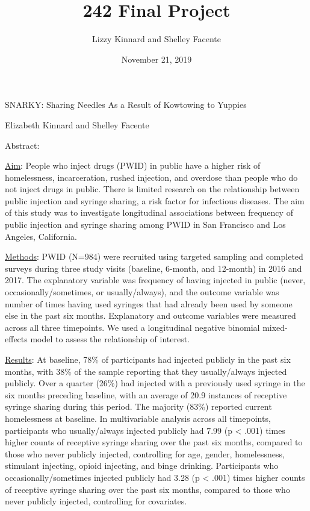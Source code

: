 \documentclass[ignorenonframetext,]{beamer}
\title{242 Final Project}
\author{Lizzy Kinnard and Shelley Facente}
\date{November 21, 2019}
\begin{document}
\frame{\titlepage}

\begin{frame}{}

\begin{block}{SNARKY: Sharing Needles As a Result of Kowtowing to
Yuppies}

\vspace{8pt}

Elizabeth Kinnard and Shelley Facente

\vspace{10pt}

\end{block}

\begin{block}{Abstract:}

\vspace{5pt}

\fontsize{7}{7}\selectfont
\underline{Aim}: People who inject drugs (PWID) in public have a higher
risk of homelessness, incarceration, rushed injection, and overdose than
people who do not inject drugs in public. There is limited research on
the relationship between public injection and syringe sharing, a risk
factor for infectious diseases. The aim of this study was to investigate
longitudinal associations between frequency of public injection and
syringe sharing among PWID in San Francisco and Los Angeles, California.

\underline{Methods}: PWID (N=984) were recruited using targeted sampling
and completed surveys during three study visits (baseline, 6-month, and
12-month) in 2016 and 2017. The explanatory variable was frequency of
having injected in public (never, occasionally/sometimes, or
usually/always), and the outcome variable was number of times having
used syringes that had already been used by someone else in the past six
months. Explanatory and outcome variables were measured across all three
timepoints. We used a longitudinal negative binomial mixed-effects model
to assess the relationship of interest.

\underline{Results}: At baseline, 78\% of participants had injected
publicly in the past six months, with 38\% of the sample reporting that
they usually/always injected publicly. Over a quarter (26\%) had
injected with a previously used syringe in the six months preceding
baseline, with an average of 20.9 instances of receptive syringe sharing
during this period. The majority (83\%) reported current homelessness at
baseline. In multivariable analysis across all timepoints, participants
who usually/always injected publicly had 7.99 (p \textless{} .001) times
higher counts of receptive syringe sharing over the past six months,
compared to those who never publicly injected, controlling for age,
gender, homelessness, stimulant injecting, opioid injecting, and binge
drinking. Participants who occasionally/sometimes injected publicly had
3.28 (p \textless{} .001) times higher counts of receptive syringe
sharing over the past six months, compared to those who never publicly
injected, controlling for covariates.


\end{block}
\end{frame}
\end{document}
